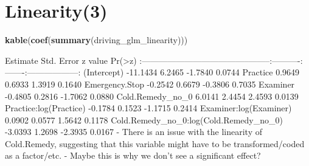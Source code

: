 \documentclass[]{article}
\newenvironment{Shaded}{}{}
\newcommand{\KeywordTok}[1]{\textcolor[rgb]{0.00,0.44,0.13}{\textbf{{#1}}}}
\newcommand{\DataTypeTok}[1]{\textcolor[rgb]{0.56,0.13,0.00}{{#1}}}
\newcommand{\DecValTok}[1]{\textcolor[rgb]{0.25,0.63,0.44}{{#1}}}
\newcommand{\StringTok}[1]{\textcolor[rgb]{0.25,0.44,0.63}{{#1}}}
\newcommand{\CommentTok}[1]{\textcolor[rgb]{0.38,0.63,0.69}{\textit{{#1}}}}
\newcommand{\NormalTok}[1]{{#1}}
\begin{document}
\begin{Shaded}
\end{Shaded}

\section{Linearity(3)}\label{linearity3}

\begin{Shaded}
\begin{Highlighting}[]
\KeywordTok{kable}\NormalTok{(}\KeywordTok{coef}\NormalTok{(}\KeywordTok{summary}\NormalTok{(driving_glm_linearity)))}
\end{Highlighting}
\end{Shaded}

\textbar{} \textbar{} Estimate\textbar{} Std. Error\textbar{} z
value\textbar{} Pr(\textgreater{}\textbar{}z\textbar{})\textbar{}
\textbar{}:--------------------------------------\textbar{}--------:\textbar{}----------:\textbar{}-------:\textbar{}------------------:\textbar{}
\textbar{}(Intercept) \textbar{} -11.1434\textbar{} 6.2465\textbar{}
-1.7840\textbar{} 0.0744\textbar{} \textbar{}Practice \textbar{}
0.9649\textbar{} 0.6933\textbar{} 1.3919\textbar{} 0.1640\textbar{}
\textbar{}Emergency.Stop \textbar{} -0.2542\textbar{} 0.6679\textbar{}
-0.3806\textbar{} 0.7035\textbar{} \textbar{}Examiner \textbar{}
-0.4805\textbar{} 0.2816\textbar{} -1.7062\textbar{} 0.0880\textbar{}
\textbar{}Cold.Remedy\_no\_0 \textbar{} 6.0141\textbar{}
2.4454\textbar{} 2.4593\textbar{} 0.0139\textbar{}
\textbar{}Practice:log(Practice) \textbar{} -0.1784\textbar{}
0.1523\textbar{} -1.1715\textbar{} 0.2414\textbar{}
\textbar{}Examiner:log(Examiner) \textbar{} 0.0902\textbar{}
0.0577\textbar{} 1.5642\textbar{} 0.1178\textbar{}
\textbar{}Cold.Remedy\_no\_0:log(Cold.Remedy\_no\_0) \textbar{}
-3.0393\textbar{} 1.2698\textbar{} -2.3935\textbar{} 0.0167\textbar{} -
There is an issue with the linearity of Cold.Remedy, suggesting that
this variable might have to be transformed/coded as a factor/etc. -
Maybe this is why we don't see a significant effect?
\end{document}
